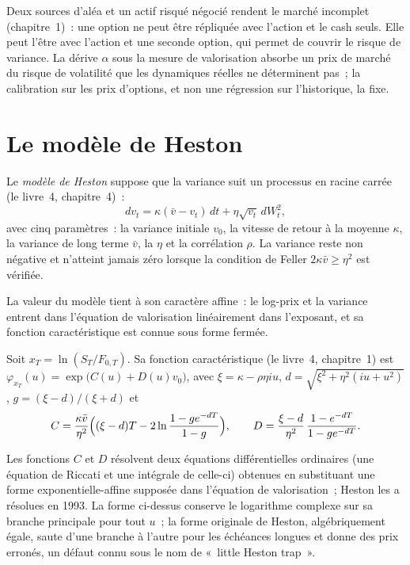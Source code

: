 Deux sources d'aléa et un actif risqué négocié rendent le marché incomplet (chapitre~1)~: une
option ne peut être répliquée avec l'action et le cash seuls. Elle peut l'être avec l'action et une seconde
option, qui permet de couvrir le risque de variance. La dérive $\alpha$ sous la mesure de valorisation absorbe un
prix de marché du risque de volatilité que les dynamiques réelles ne déterminent pas~; la calibration sur
les prix d'options, et non une régression sur l'historique, la fixe.

\section{Le modèle de Heston}

\begin{definition}\label{def:dv:stochastic-volatility:heston}
Le \emph{modèle de Heston} suppose que la variance suit un processus en racine carrée (le
livre~4, chapitre~4)~:
\[
dv_t=\kappa(\bar v-v_t)\,dt+\eta\sqrt{v_t}\,dW^2_t,
\]
avec cinq paramètres~: la variance initiale $v_0$, la vitesse de retour à la moyenne $\kappa$, la variance de long
terme $\bar v$, la  $\eta$ et la corrélation $\rho$. La variance reste
non négative et n'atteint jamais zéro lorsque la condition de Feller $2\kappa\bar v\ge\eta^2$ est vérifiée.
\end{definition}

La valeur du modèle tient à son caractère affine~: le log-prix et la variance entrent dans l'équation de valorisation
linéairement dans l'exposant, et sa fonction caractéristique est connue sous forme fermée.

\begin{proposition}\label{prop:dv:stochastic-volatility:cf}
Soit $x_T=\ln(S_T/F_{0,T})$. Sa fonction caractéristique (le livre~4, chapitre~1) est
$\varphi_{x_T}(u)=\exp\bigl(C(u)+D(u)v_0\bigr)$, avec $\xi=\kappa-\rho\eta iu$,
$d=\sqrt{\xi^2+\eta^2(iu+u^2)}$, $g=(\xi-d)/(\xi+d)$ et
\[
C=\frac{\kappa\bar v}{\eta^2}\Bigl((\xi-d)T-2\ln\frac{1-ge^{-dT}}{1-g}\Bigr),\qquad
D=\frac{\xi-d}{\eta^2}\,\frac{1-e^{-dT}}{1-ge^{-dT}} .
\]
\end{proposition}
\admitted

Les fonctions $C$ et $D$ résolvent deux équations différentielles ordinaires (une équation de Riccati et une
intégrale de celle-ci) obtenues en substituant une forme exponentielle-affine supposée dans l'équation de valorisation~;
Heston les a résolues en 1993. La forme ci-dessus conserve le logarithme complexe sur sa branche principale pour
tout $u$~; la forme originale de Heston, algébriquement égale, saute d'une branche à l'autre pour les échéances longues et
donne des prix erronés, un défaut connu sous le nom de «~little Heston trap~».

